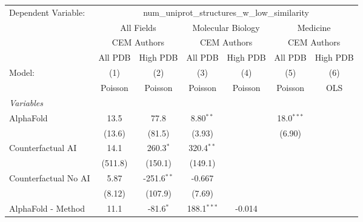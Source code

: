 \begingroup
\centering
\begin{tabular}{lcccccc}
   \tabularnewline \midrule \midrule
   Dependent Variable: & \multicolumn{6}{c}{num\_uniprot\_structures\_w\_low\_similarity}\\
 & \multicolumn{2}{c}{All Fields} & \multicolumn{2}{c}{Molecular Biology} & \multicolumn{2}{c}{Medicine} \\
\cmidrule(lr){2-3} \cmidrule(lr){4-5} \cmidrule(lr){6-7}
 & \multicolumn{2}{c}{CEM Authors} & \multicolumn{2}{c}{CEM Authors} & \multicolumn{2}{c}{CEM Authors} \\
\cmidrule(lr){2-3} \cmidrule(lr){4-5} \cmidrule(lr){6-7}
 & \multicolumn{1}{c}{All PDB} & \multicolumn{1}{c}{High PDB} & \multicolumn{1}{c}{All PDB} & \multicolumn{1}{c}{High PDB} & \multicolumn{1}{c}{All PDB} & \multicolumn{1}{c}{High PDB} \\
\cmidrule(lr){2-2} \cmidrule(lr){3-3} \cmidrule(lr){4-4} \cmidrule(lr){5-5} \cmidrule(lr){6-6} \cmidrule(lr){7-7}
   Model:                                                  & (1)      & (2)           & (3)           & (4)     & (5)          & (6)\\  
                                                           &  Poisson & Poisson       & Poisson       & Poisson & Poisson      & OLS\\  
   \midrule
   \emph{Variables}\\
   AlphaFold                                               & 13.5     & 77.8          & 8.80$^{**}$   &         & 18.0$^{***}$ &   \\   
                                                           & (13.6)   & (81.5)        & (3.93)        &         & (6.90)       &   \\   
   Counterfactual AI                                       & 14.1     & 260.3$^{*}$   & 320.4$^{**}$  &         &              &   \\   
                                                           & (511.8)  & (150.1)       & (149.1)       &         &              &   \\   
   Counterfactual No AI                                    & 5.87     & -251.6$^{**}$ & -0.667        &         &              &   \\   
                                                           & (8.12)   & (107.9)       & (7.69)        &         &              &   \\   
   AlphaFold - Method                                      & 11.1     & -81.6$^{*}$   & 188.1$^{***}$ & -0.014  &              &   \\   

\end{tabular}
